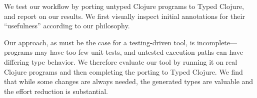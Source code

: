 We test our workflow by porting untyped Clojure programs to Typed Clojure,
and report on our results.
We first visually inspect initial annotations for their ``usefulness'' according
to our philosophy.




Our approach, as must be the case for a testing-driven tool, is
incomplete---programs may have too few unit tests, and untested
execution paths can have differing type behavior. We therefore
evaluate our tool by running it on real Clojure programs and then
completing the porting to Typed Clojure. We find that while
some changes are always needed, the generated types are
valuable and the effort reduction is substantial.

%
%
%
